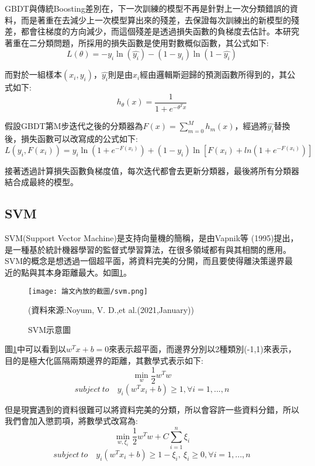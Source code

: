 \newpage

	GBDT與傳統Boosting差別在，下一次訓練的模型不再是針對上一次分類錯誤的資料，而是著重在去減少上一次模型算出來的殘差，去保證每次訓練出的新模型的殘差，都會往梯度的方向減少，而這個殘差是透過損失函數的負梯度去估計。本研究著重在二分類問題，所採用的損失函數是使用對數概似函數，其公式如下:
	$$L(\theta) = -y_i\ln\left( \hat{y_i} \right) - (1-y_i)\ln\left(1-\hat{y_i}\right)$$
	
\noindent 而對於一組樣本$(x_i,y_i)$，$\hat{y_i}$則是由$x_i$經由邏輯斯迴歸的預測函數所得到的，其公式如下:
	$$h_{\theta}(x) = \dfrac{1}{1+e^{-\theta^{T}x}}$$

\noindent 假設GBDT第M步迭代之後的分類器為$F(x)=\sum_{m=0}^{M}h_m(x)$，經過將$\hat{y_i}$替換後，損失函數可以改寫成的公式如下:
	$$L\left(y_i,F(x_i)\right) = y_i\ln\left( 1+e^{-F(x_i)} \right) + (1-y_i)\ln \left[ F(x_i)+ln\left( 1+e^{-F(x_i)} \right) \right]$$

\noindent 接著透過計算損失函數負梯度值，每次迭代都會去更新分類器，最後將所有分類器結合成最終的模型。

\newpage

\subsection{SVM}

	SVM(Support Vector Machine)是支持向量機的簡稱，是由Vapnik等 (1995)提出，是一種基於統計機器學習的監督式學習算法，在很多領域都有與其相關的應用。SVM的概念是想透過一個超平面，將資料完美的分開，而且要使得離決策邊界最近的點與其本身距離最大。如圖\ref{Fi3g12}。
	
	\begin{figure}[H]
	\centering
	\texttt{[image: 論文內放的截圖/svm.png]}
	\caption{SVM示意圖}
	(資料來源:Noyum, V. D.,et al.(2021,January))
	\label{Fi3g12}
	\end{figure}
	
\newpage
	
	圖\ref{Fi3g12}中可以看到以$w^Tx+b=0$來表示超平面，而邊界分別以2種類別(-1,1)來表示，目的是極大化區隔兩類邊界的距離，其數學式表示如下:
	$$ \mathop{min}\limits_w \dfrac{1}{2}w^Tw$$
	$$ subject\ to\quad y_i(w^Tx_i+b)\geq 1, \forall i = 1,...,n$$
	
\noindent 但是現實遇到的資料很難可以將資料完美的分類，所以會容許一些資料分錯，所以我們會加入懲罰項，將數學式改寫為:
	$$ \mathop{min}\limits_{w,\xi_i} \dfrac{1}{2}w^Tw+C\sum_{i=1}^{n}\xi_i $$
	$$ subject\ to\quad y_i(w^Tx_i+b)\geq 1-\xi_i,\ \xi_i\geq 0 ,\forall i = 1,...,n$$
	

